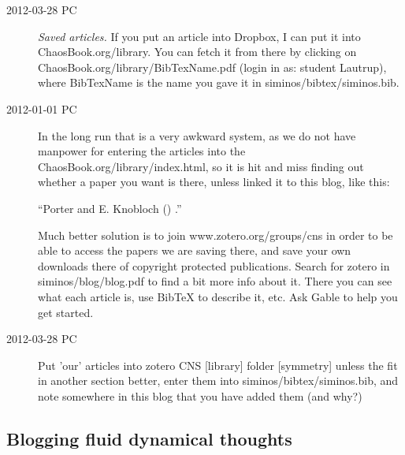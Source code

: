 \begin{description}

\item[2012-03-28 PC] \emph{Saved articles.} If you put an article into
Dropbox, I can put it into 
{ChaosBook.org/library}. You can fetch it from there by clicking on
ChaosBook.org/library/BibTexName.pdf (login in as: student Lautrup),
where BibTexName is the name you gave it in siminos/bibtex/siminos.bib.

\item[2012-01-01 PC] In the long run that is a very awkward system, as we
do not have manpower for entering the articles into the
ChaosBook.org/library/index.html, so it is hit and miss finding out
whether a paper you want is there, unless linked it to this blog, like
this:

``Porter and E. Knobloch
()
.''

Much better solution is to join 
{www.zotero.org/groups/cns} in order to be able to access the papers we
are saving there, and save your own downloads there of copyright
protected publications. Search for zotero in siminos/blog/blog.pdf to
find a bit more info about it. There you can see what each article is,
use BibTeX to describe it, etc. Ask Gable to help you get started.

\item[2012-03-28 PC]
Put 'our' articles into zotero CNS [library] folder [symmetry] unless the
fit in another section better, enter them into
siminos/bibtex/siminos.bib, and note somewhere in this blog that you have
added them (and why?)

\end{description}



\subsection{Blogging fluid dynamical thoughts}

